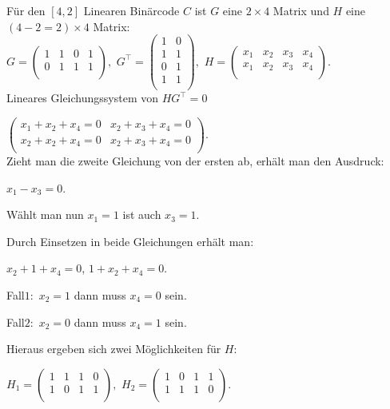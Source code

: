     \begin{Beispiel}
    F{\"u}r den $[4,2]$ Linearen Binärcode \(C\) ist $G$  eine $2 \times 4$ Matrix und $H$ eine $(4-2=2) \times 4$ Matrix:\\
    
    $G=\left( \begin{array}{rrrr}
        1 & 1 & 0 & 1\\
        0 & 1 & 1 & 1\\
     \end{array}\right),
    $
    $G^\intercal=\left( \begin{array}{rrr}
    1 & 0 \\
    1 & 1 \\
    0 & 1 \\
    1 & 1 \\
    \end{array}\right),
    $
    $H=\left( \begin{array}{rrrr}
    x_1 & x_2 & x_3 & x_4 \\
    x_1 & x_2 & x_3 & x_4 \\
    \end{array}\right).
    $
    \\
    
    Lineares Gleichungssystem von $HG^\intercal = 0$ 
    
    
    $\left( \begin{array}{rrr}
        x_1+x_2+x_4 = 0 & x_2+x_3+x_4 = 0 \\
        x_2+x_2+x_4 = 0 & x_2+x_3+x_4 = 0 \\
     \end{array}\right).
    $\\
    
    Zieht man die zweite Gleichung von der ersten ab, erhält man den Ausdruck:
    
    $x_1-x_3 = 0$.
    
    Wählt man nun $x_1=1$ ist auch $x_3=1$. 
    
    Durch Einsetzen in beide Gleichungen erhält man:
    
    $x_2+1+x_4=0$,
    $1+x_2+x_4=0$.
    
    Fall$1:$ $x_2=1$ dann muss $x_4=0$ sein. 
    
    Fall$2:$ $x_2=0$ dann muss $x_4=1$ sein.
    
    Hieraus ergeben sich zwei Möglichkeiten für $H$:
    
    
    $H_1=\left( \begin{array}{rrrr}
                 1 & 1 & 1 & 0 \\
                 1 & 0 & 1 & 1 \\
                \end{array}\right),
    $
    $H_2=\left( \begin{array}{rrrr}
        1 & 0 & 1 & 1 \\
        1 & 1 & 1 & 0 \\
       \end{array}\right).
    $\\
\pagebreak
    

\end{Beispiel}
